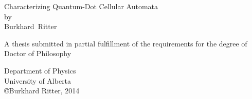 \begin{titlepage}
\begin{center}
  \large

  \hfill
  \vfill

  Characterizing Quantum-Dot Cellular Automata\\ \bigskip
  by\\ \bigskip
  Burkhard~Ritter

  \vfill

  A thesis submitted in partial fulfillment of the requirements for the degree
  of\\ \bigskip
  Doctor of Philosophy \\

  \vfill

  Department of Physics\\
  University of Alberta \\

  \vfill
  \vspace*{1cm}
  \copyright Burkhard Ritter, 2014
\end{center}  
\end{titlepage}   

